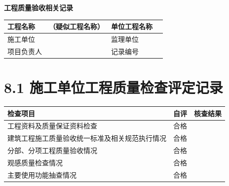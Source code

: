 \documentclass[UTF8,10pt,a4paper,fontset=fandol]{ctexart}
\newcommand{\fieldvalue}[1]{#1}
\newcommand{\handwritten}[1]{#1}
\begin{document}
\begin{center}
\textbf{工程质量验收相关记录}
\end{center}

\begin{tabularx}{\textwidth}{|>{\RaggedRight\arraybackslash}p{}|X|>{\RaggedRight\arraybackslash}p{}|X|}
\hline
工程名称 & 
\fieldvalue{\handwritten{（疑似工程名称）}} &
单位工程名称 & \\ \hline
施工单位 & & 监理单位 & \\ \hline
项目负责人 & & 记录编号 & \\ \hline
\end{tabularx}

\vspace{1em}

\section{8.1 施工单位工程质量检查评定记录}

\begin{tabularx}{\textwidth}{|>{\RaggedRight\arraybackslash}p{}|>{\RaggedRight\arraybackslash}p{}|X|}
\hline
检查项目 & 自评 & 核查结果 \\ \hline
工程资料及质量保证资料检查 & 
\fieldvalue{\handwritten{合格}} & \\ \hline
建筑工程施工质量验收统一标准及相关规范执行情况 & 
\fieldvalue{\handwritten{合格}} & \\ \hline
分部、分项工程质量验收情况 & 
\fieldvalue{\handwritten{合格}} & \\ \hline
观感质量检查情况 & 
\fieldvalue{\handwritten{合格}} & \\ \hline
主要使用功能抽查情况 & 
\fieldvalue{\handwritten{合格}} & \\ \hline
\end{tabularx}
\end{document}
